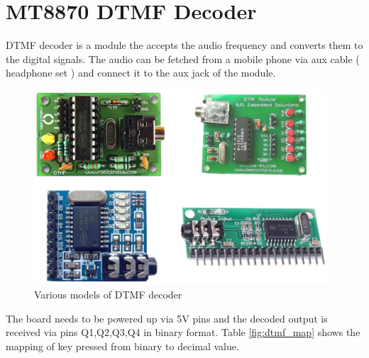 \section{MT8870 DTMF Decoder}

\ac{DTMF} decoder is a module the accepts the audio frequency and converts them to the digital signals. The audio can be fetched from a mobile phone via aux cable ( headphone set ) and connect it to the aux jack of the module. 

\begin{figure}
    \centering
    \includegraphics[width=4.3in]{Images/DTMF/DTMF_series.png}
    \caption[MT8870 DTMF decoder]{Various models of \ac{DTMF} decoder}
\end{figure}

\par The board needs to be powered up via 5V pins and the decoded output is received via pins Q1,Q2,Q3,Q4 in binary format. Table \ref{fig:dtmf_map} shows the mapping of key pressed from binary to decimal value.

